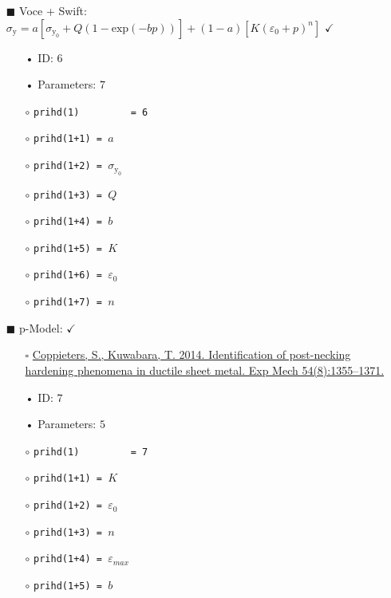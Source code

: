 \documentclass[11pt,a4paper,twoside,final,onecolumn,titlepage]{article}
\newcommand{\verified}{\hspace{0.5pt} {\LARGE $\checkmark$}}
\begin{document}
\newpage
\begin{itemize}
	\item[\tiny$\blacksquare$] Voce + Swift: $\displaystyle \sigma_{\textrm{y}} = a\left[\sigma_{\textrm{y}_0} + Q\left(1-\textrm{exp}(-bp)\right)\right]+ (1-a)\left[K(\varepsilon_0+p)^n\right]$ \verified{}
	\begin{itemize}
		\item[•] ID: $6$
		\item[•] Parameters: $7$\\
		\item[$\circ$] \texttt{prihd(1)\,\,\,\,\,\,\,\,\,= 6}
		\item[$\circ$] \texttt{prihd(1+1) = $a$}
		\item[$\circ$] \texttt{prihd(1+2) = $\sigma_{\textrm{y}_0} $}
		\item[$\circ$] \texttt{prihd(1+3) = $Q$}
		\item[$\circ$] \texttt{prihd(1+4) = $b$}
		\item[$\circ$] \texttt{prihd(1+5) = $K$}
		\item[$\circ$] \texttt{prihd(1+6) = $\varepsilon_0$}
		\item[$\circ$] \texttt{prihd(1+7) = $n$}
	\end{itemize}
\end{itemize}

\begin{itemize}
	\item[\tiny$\blacksquare$] p-Model: \verified{}
	\begin{itemize}
        \item[\tiny$\square$] {\small \href{https://doi.org/10.1007/s11340-014-9900-4}{Coppieters, S., Kuwabara, T. 2014. Identification of post-necking hardening phenomena in ductile sheet metal. Exp Mech 54(8):1355–1371.}}\\
		\item[•] ID: $7$
		\item[•] Parameters: $5$\\
		\item[$\circ$] \texttt{prihd(1)\,\,\,\,\,\,\,\,\,= 7}
		\item[$\circ$] \texttt{prihd(1+1) = $K$}
		\item[$\circ$] \texttt{prihd(1+2) = $\varepsilon_0$}
		\item[$\circ$] \texttt{prihd(1+3) = $n$}
		\item[$\circ$] \texttt{prihd(1+4) = $\varepsilon_{max}$}
		\item[$\circ$] \texttt{prihd(1+5) = $b$}
	\end{itemize}
\end{itemize}
\end{document}
